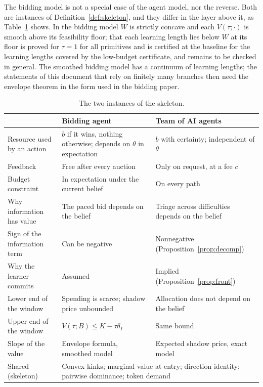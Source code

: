 \documentclass[11pt]{article}
\theoremstyle{definition}
\begin{document}
The bidding model is not a special case of the agent model, nor the reverse. Both are instances of Definition~\ref{def:skeleton}, and they differ in the layer above it, as Table~\ref{tab:layers} shows. In the bidding model $W$ is strictly concave and each $V(\tau;\cdot)$ is smooth above its feasibility floor; that each learning length lies below $W$ at its floor is proved for $\tau=1$ for all primitives and is certified at the baseline for the learning lengths covered by the low-budget certificate, and remains to be checked in general. The smoothed bidding model has a continuum of learning lengths; the statements of this document that rely on finitely many branches then need the envelope theorem in the form used in the bidding paper.

\begin{table}[htbp]
\centering
\small
\begin{tabular}{@{}p{}p{}p{}@{}}
\toprule
 & Bidding agent & Team of AI agents \\
\midrule
Resource used by an action & $b$ if it wins, nothing otherwise; depends on $\theta$ in expectation & $b$ with certainty; independent of $\theta$ \\
Feedback & Free after every auction & Only on request, at a fee $c$ \\
Budget constraint & In expectation under the current belief & On every path \\
Why information has value & The paced bid depends on the belief & Triage across difficulties depends on the belief \\
Sign of the information term & Can be negative & Nonnegative (Proposition~\ref{prop:decomp}) \\
Why the learner commits & Assumed & Implied (Proposition~\ref{prop:front}) \\
Lower end of the window & Spending is scarce; shadow price unbounded & Allocation does not depend on the belief \\
Upper end of the window & $V(\tau;B)\le K-\tau\delta_I$ & Same bound \\
Slope of the value & Envelope formula, smoothed model & Expected shadow price, exact model \\
\midrule
Shared (skeleton) & \multicolumn{2}{p{0.66\textwidth}}{Convex kinks; marginal value at entry; direction identity; pairwise dominance; token demand} \\
\bottomrule
\end{tabular}
\caption{The two instances of the skeleton.}
\label{tab:layers}
\end{table}
\end{document}

